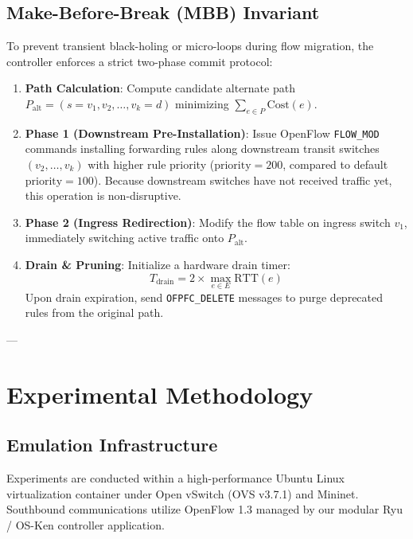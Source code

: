 \documentclass[journal,10pt,twocolumn]{IEEEtran}
\begin{document}
\subsection{Make-Before-Break (MBB) Invariant}
To prevent transient black-holing or micro-loops during flow migration, the controller enforces a strict two-phase commit protocol:
\begin{enumerate}
    \item \textbf{Path Calculation}: Compute candidate alternate path $P_{\text{alt}} = (s = v_1, v_2, \dots, v_k = d)$ minimizing $\sum_{e \in P} \text{Cost}(e)$.
    \item \textbf{Phase 1 (Downstream Pre-Installation)}: Issue OpenFlow \texttt{FLOW\_MOD} commands installing forwarding rules along downstream transit switches $(v_2, \dots, v_k)$ with higher rule priority ($\text{priority} = 200$, compared to default $\text{priority} = 100$). Because downstream switches have not received traffic yet, this operation is non-disruptive.
    \item \textbf{Phase 2 (Ingress Redirection)}: Modify the flow table on ingress switch $v_1$, immediately switching active traffic onto $P_{\text{alt}}$.
    \item \textbf{Drain \& Pruning}: Initialize a hardware drain timer:
    \begin{equation}
    T_{\text{drain}} = 2 \times \max_{e \in E} \text{RTT}(e)
    \end{equation}
    Upon drain expiration, send \texttt{OFPFC\_DELETE} messages to purge deprecated rules from the original path.
\end{enumerate}

---

\section{Experimental Methodology}
\label{sec:methodology}

\subsection{Emulation Infrastructure}
Experiments are conducted within a high-performance Ubuntu Linux virtualization container under Open vSwitch (OVS v3.7.1) and Mininet. Southbound communications utilize OpenFlow 1.3 managed by our modular Ryu / OS-Ken controller application.
\end{document}
